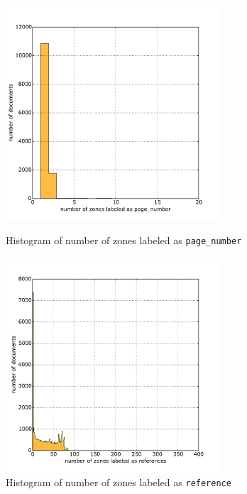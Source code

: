 \begin{appendix}
\begin{figure}
\centering
\begin{minipage}[t!]{0.48\linewidth}
  \includegraphics[width=8cm]{plots/page_number_histogram}
  \caption{Histogram of number of zones labeled as \texttt{page\_number}}
  \label{fig:page_number_histogram}
\end{minipage}
\quad
\begin{minipage}[t!]{0.48\linewidth}
  \includegraphics[width=8cm]{plots/references_histogram}
  \caption{Histogram of number of zones labeled as \texttt{reference}}
  \label{fig:reference_histogram}
\end{minipage}
\end{figure}


\end{appendix}
